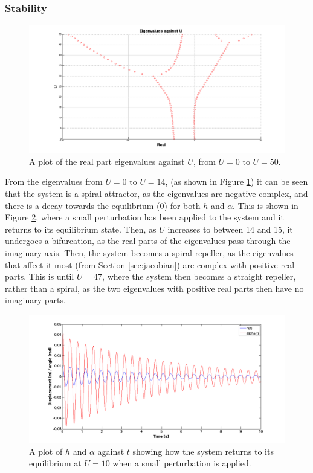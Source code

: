 \subsubsection{Stability}
\begin{figure}[H]
\centering
\includegraphics[width=1.0\textwidth]{realeigu.png}
\caption{\label{fig:realeigu} A plot of the real part eigenvalues against $U$, from $U = 0$ to $U=50$.  }
\end{figure}


\noindent From the eigenvalues from $U = 0$ to $U = 14$, (as shown in Figure \ref{fig:realeigu}) it can be seen that the system is a spiral attractor, as the eigenvalues are negative complex, and there is a decay towards the equilibrium (0) for both $h$ and $\alpha$. This is shown in Figure \ref{fig:k395attract}, where a small perturbation has been applied to the system and it returns to its equilibrium state. Then, as $U$ increases to between 14 and 15, it undergoes a bifurcation, as the real parts of the eigenvalues pass through the imaginary axis. Then, the system  becomes a spiral repeller, as the eigenvalues that affect it most (from Section \ref{sec:jacobian}) are complex with positive real parts. This is until $U= 47$, where the system then becomes a straight repeller, rather than a spiral, as the two eigenvalues with positive real parts then have no imaginary parts.\\  

\begin{figure}[H]
\centering
\includegraphics[width=1.0\textwidth]{k395attract.png}
\caption{\label{fig:k395attract} A plot of $h$ and $\alpha$ against $t$ showing how the system returns to its equilibrium at $U=10$ when a small perturbation is applied.  }
\end{figure}

